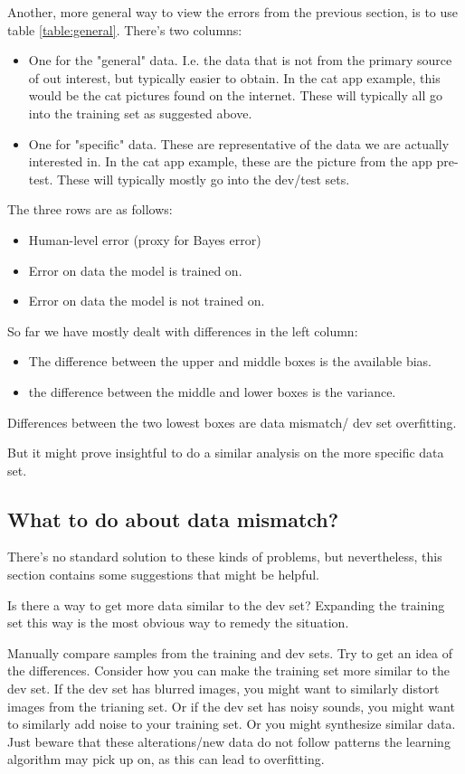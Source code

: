 \documentclass[12pt, a4paper]{article}
\numberwithin{equation}{section}
\begin{document}
Another, more general way to view the errors from the previous section, is to use table \ref{table:general}. There's two columns:
\begin{itemize}
\item One for the "general" data. I.e. the data that is not from the primary source of out interest, but typically easier to obtain. In the cat app example, this would be the cat pictures found on the internet. These will typically all go into the training set as suggested above.
\item One for "specific" data. These are representative of the data we are actually interested in. In the cat app example, these are the picture from the app pre-test. These will typically mostly go into the dev/test sets.
\end{itemize}
The three rows are as follows:
\begin{itemize}
\item Human-level error (proxy for Bayes error)
\item Error on data the model is trained on.
\item Error on data the model is not trained on.
\end{itemize}
So far we have mostly dealt with differences in the left column:
\begin{itemize}
\item The difference between the upper and middle boxes is the available bias.
\item the difference between the middle and lower boxes is the variance.
\end{itemize}
Differences between the two lowest boxes are data mismatch/
dev set overfitting.

But it might prove insightful to do a similar analysis on the more specific data set.

\subsection{What to do about data mismatch?}
There's no standard solution to these kinds of problems, but nevertheless, this section contains some suggestions that might be helpful.

Is there a way to get more data similar to the dev set? Expanding the training set this way is the most obvious way to remedy the situation.

Manually compare samples from the training and dev sets. Try to get an idea of the differences. Consider how you can make the training set more similar to the dev set. If the dev set has blurred images, you might want to similarly distort images from the trianing set. Or if the dev set has noisy sounds, you might want to similarly add noise to your training set. Or you might synthesize similar data. Just beware that these alterations/new data do not follow patterns the learning algorithm may pick up on, as this can lead to overfitting.
\end{document}
